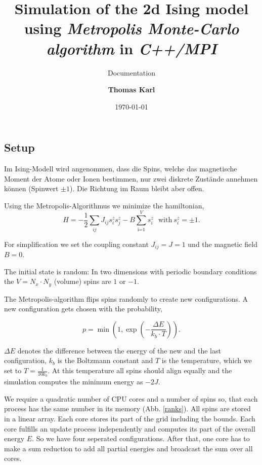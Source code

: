 \documentclass[headsepline=3pt,headinclude=true,14pt]{scrartcl}
\title{Simulation of the 2d Ising model using \textit{Metropolis Monte-Carlo algorithm} in \textit{C++/MPI}}
\subtitle{Documentation}
\date{\today}
\author{\textbf{Thomas Karl}%
}
\begin{document}
\begin{onehalfspace}
\maketitle

\section{Setup}
Im Ising-Modell wird angenommen, dass die Spins, welche das magnetische Moment der Atome oder Ionen bestimmen, nur zwei diskrete Zustände annehmen können (Spinwert $\pm 1$). Die Richtung im Raum bleibt aber offen.

Using the Metropolis-Algorithmus we minimize the hamiltonian,
\begin{equation}
H = -\frac{1}{2}\sum_{ij} J_{ij}s^z_is^z_j - B\sum_{\text{i=1}}^Vs_i^{z} ~~~ \text{with} ~ s_i^z = \pm 1.
\end{equation}

For simplification we set the coupling constant $J_{ij}=J=1$ und the magnetic field $B = 0$. 

The initial state is random: In two dimensions with periodic boundary conditions the $V = N_x\cdot N_y$ (volume) spins are $1$ or $-1$. 

\newpage
The Metropolis-algorithm flips spins randomly to create new configurations. A new configuration gets chosen with the probability, 

\begin{equation}
p = \min\left( 1, \exp\left(-\frac{\Delta E}{k_b\cdot T}\right) \right).
\end{equation}

$\Delta E$ denotes the difference between the energy of the new and the last configuration, $k_b$ is the Boltzmann constant and $T$ is the temperature, which we set to $T=\frac{1}{10k_b}$. At this temperature all spins should align equally and the simulation computes the minimum energy as $-2J$.

We require a quadratic number of CPU cores and a number of spins so, that each process has the same number in its memory  (Abb. \ref{ranks}). All spins are stored in a linear array. Each core stores its part of the grid including the bounds. Each core fulfills an update process independently and computes its part of the overall energy $E$. So  we have four seperated configurations. After that, one core has to make a sum reduction to add all partial energies and broadcast the sum over all cores.


\end{onehalfspace}
\end{document}
